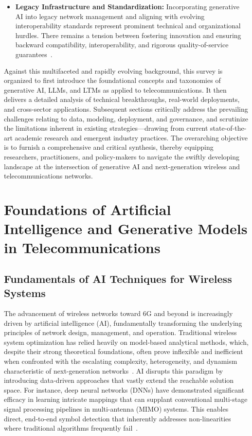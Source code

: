 \begin{itemize}
    \item \textbf{Legacy Infrastructure and Standardization:} Incorporating generative AI into legacy network management and aligning with evolving interoperability standards represent prominent technical and organizational hurdles. There remains a tension between fostering innovation and ensuring backward compatibility, interoperability, and rigorous quality-of-service guarantees~\cite{ref25, ref39, ref40, ref46}.
\end{itemize}

Against this multifaceted and rapidly evolving background, this survey is organized to first introduce the foundational concepts and taxonomies of generative AI, LLMs, and LTMs as applied to telecommunications. It then delivers a detailed analysis of technical breakthroughs, real-world deployments, and cross-sector applications. Subsequent sections critically address the prevailing challenges relating to data, modeling, deployment, and governance, and scrutinize the limitations inherent in existing strategies—drawing from current state-of-the-art academic research and emergent industry practices. The overarching objective is to furnish a comprehensive and critical synthesis, thereby equipping researchers, practitioners, and policy-makers to navigate the swiftly developing landscape at the intersection of generative AI and next-generation wireless and telecommunications networks.

\section{Foundations of Artificial Intelligence and Generative Models in Telecommunications}

\subsection{Fundamentals of AI Techniques for Wireless Systems}

The advancement of wireless networks toward 6G and beyond is increasingly driven by artificial intelligence (AI), fundamentally transforming the underlying principles of network design, management, and operation. Traditional wireless system optimization has relied heavily on model-based analytical methods, which, despite their strong theoretical foundations, often prove inflexible and inefficient when confronted with the escalating complexity, heterogeneity, and dynamism characteristic of next-generation networks~\cite{ref46}. AI disrupts this paradigm by introducing data-driven approaches that vastly extend the reachable solution space. For instance, deep neural networks (DNNs) have demonstrated significant efficacy in learning intricate mappings that can supplant conventional multi-stage signal processing pipelines in multi-antenna (MIMO) systems. This enables direct, end-to-end symbol detection that inherently addresses non-linearities where traditional algorithms frequently fail~\cite{ref43}. 

